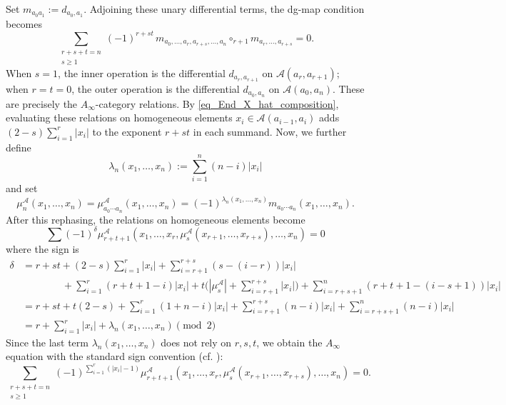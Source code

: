 \documentclass[11pt,letterpaper]{article}
\numberwithin{equation}{section}
\theoremstyle{plain}
\theoremstyle{definition}
\theoremstyle{remark}
\begin{document}
	Set $m_{a_0a_1}:=d_{a_0,a_1}$.
	Adjoining these unary differential terms, the dg-map condition becomes
	\begin{equation}
		\label{eq_Ainfty_category_Stasheff_relations}
		\sum_{\substack{
				r+s+t=n\\
				s\geq1
		}}
		(-1)^{r+st}
		\,
		m_{a_0,\ldots,a_r,a_{r+s},\ldots,a_n}
		\circ_{r+1}
		m_{a_r,\ldots,a_{r+s}}
		=0.
	\end{equation}
	When $s=1$, the inner operation is the differential $d_{a_r,a_{r+1}}$ on
	$\mathcal A(a_r,a_{r+1})$; when $r=t=0$, the outer operation is the
	differential $d_{a_0,a_n}$ on $\mathcal A(a_0,a_n)$. These are precisely the
	$A_\infty$-category relations.
	By \eqref{eq_End_X_hat_composition}, evaluating these relations on
	homogeneous elements $x_i\in\mathcal A(a_{i-1},a_i)$ adds
	$(2-s)\sum_{i=1}^{r}|x_i|$ to the exponent $r+st$ in each summand.
	Now, we further define
	$$\lambda_n(x_1,\ldots,x_n)
	:=
	\sum_{i=1}^{n}(n-i)|x_i|$$
	and set
	\begin{equation*}
			\mu^{\mathcal A}_n(x_1,\ldots,x_n)
			={}  \mu^{\mathcal A}_{a_0\cdots a_n} (x_1,\dots, x_n) 
			={}
			(-1)^{\lambda_n(x_1,\ldots,x_n)}
			m_{a_0\cdots a_n}(x_1,\ldots,x_n).
	\end{equation*}
	After this rephasing, the relations on homogeneous elements become $$
	\sum (-1)^\delta \mu_{r+t+1}^{\mathcal A} (x_1,\dots, x_r, \mu_s^{\mathcal A}(x_{r+1},\dots, x_{r+s}), \dots, x_n) =0$$
	where the sign is
	\begin{align*}
		\delta &= r+st+ (2-s)\sum_{i=1}^r  |x_i|  + \sum_{i=r+1}^{r+s}(s-(i-r))|x_i|
		\\
		&\qquad \qquad + \sum_{i=1}^r (r+t+1-i) |x_i| + t \Big(|\mu_s^{\mathcal A}|+\sum_{i=r+1}^{r+s}|x_i| \Big) + \sum_{i=r+s+1}^n (r+t+1-(i-s+1)) |x_i|  \\
		&=
		r+st + t(2-s)+\sum_{i=1}^r (1+n-i) |x_i| + \sum_{i=r+1}^{r+s} (n-i)|x_i| + \sum_{i=r+s+1}^n (n-i) |x_i| \\
		&= r + \sum_{i=1}^r |x_i| + \lambda_n(x_1,\dots, x_n)  \pmod 2
	\end{align*}
	Since the last term $\lambda_n(x_1,\dots,x_n)$ does not rely on $r,s,t$, we obtain the $A_\infty$ equation with the standard sign convention (cf. \cite{SeidelBook,FOOOBookOne}):
	\begin{equation*}
		\sum_{\substack{
				r+s+t=n\\
				s\geq1
		}}
		(-1)^{\sum_{i=1}^r(|x_i|-1)} \mu_{r+t+1}^{\mathcal A} (x_1,\dots, x_r, \mu_s^{\mathcal A}(x_{r+1},\dots, x_{r+s}), \dots, x_n) =0.
	\end{equation*}
\end{document}

